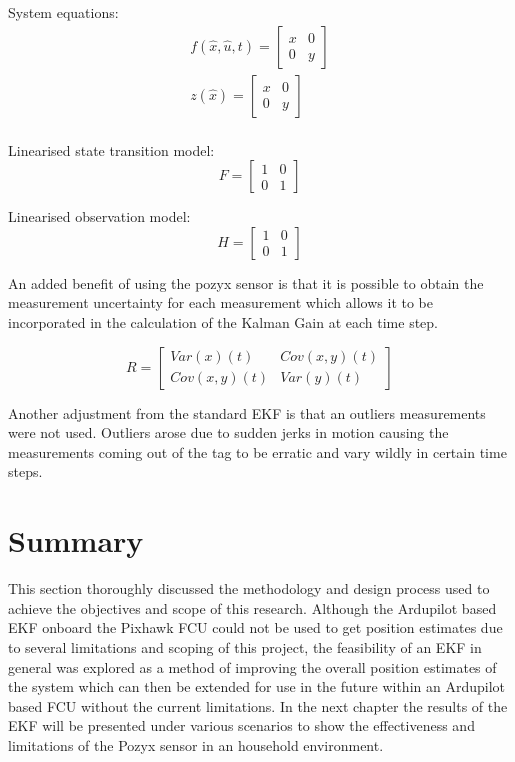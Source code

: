 System equations:
\begin{equation*}
    \begin{split}
        f(\hat{x},\hat{u},t) = \left[ \begin{array}{cc}
                              x & 0\\
                              0 & y
        \end{array} \right]\\
        z(\hat{x}) = \left[ \begin{array}{cc}
                              x & 0\\
                              0 & y
        \end{array} \right]\\
    \end{split}
\end{equation*}


Linearised state transition model:
\[
    F =
    \left[ \begin{array}{cc}
    1 & 0\\
    0 & 1
    \end{array}
    \right]
\]

Linearised observation model:
\[
    H =
    \left[ \begin{array}{cc}
    1 & 0\\
    0 & 1
    \end{array}
    \right]
\]

An added benefit of using the pozyx sensor is that it is possible to obtain the measurement uncertainty for each measurement which allows it to be incorporated in the calculation of the Kalman Gain at each time step.

\[
    R =
%
        \left[
            \begin{array}{cc}
                Var(x)(t) & Cov(x,y)(t)\\
                Cov(x,y)(t) & Var(y)(t)
            \end{array}
        \right]
\]

Another adjustment from the standard EKF is that an outliers measurements were not used.
Outliers arose due to sudden jerks in motion causing the measurements coming out of the tag to be erratic and vary wildly in certain time steps.

\section{Summary}
This section thoroughly discussed the methodology and design process used to achieve the objectives and scope of this research.
Although the Ardupilot based EKF onboard the Pixhawk FCU could not be used to get position estimates due to several
limitations and scoping of this project, the feasibility of an EKF in general was explored as a method of improving the
overall position estimates of the system which can then be extended for use in the future within an Ardupilot based FCU without the current limitations.
In the next chapter the results of the EKF will be presented under various scenarios to show the effectiveness and limitations of the Pozyx sensor in an household environment.
